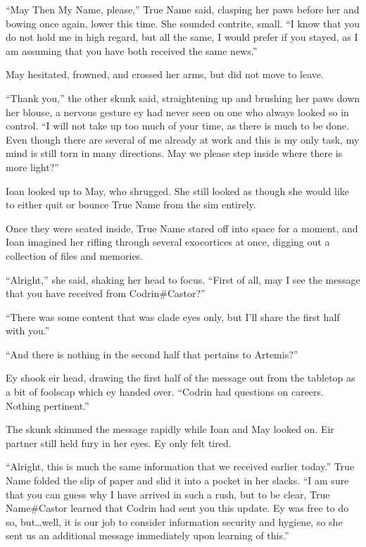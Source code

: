 ``May Then My Name, please,'' True Name said, clasping her paws before her and bowing once again, lower this time. She sounded contrite, small. ``I know that you do not hold me in high regard, but all the same, I would prefer if you stayed, as I am assuming that you have both received the same news.''

May hesitated, frowned, and crossed her arms, but did not move to leave.

``Thank you,'' the other skunk said, straightening up and brushing her paws down her blouse, a nervous gesture ey had never seen on one who always looked so in control. ``I will not take up too much of your time, as there is much to be done. Even though there are several of me already at work and this is my only task, my mind is still torn in many directions. May we please step inside where there is more light?''

Ioan looked up to May, who shrugged. She still looked as though she would like to either quit or bounce True Name from the sim entirely.

Once they were seated inside, True Name stared off into space for a moment, and Ioan imagined her rifling through several exocortices at once, digging out a collection of files and memories.

``Alright,'' she said, shaking her head to focus. ``First of all, may I see the message that you have received from Codrin\#Castor?''

``There was some content that was clade eyes only, but I'll share the first half with you.''

``And there is nothing in the second half that pertains to Artemis?''

Ey shook eir head, drawing the first half of the message out from the tabletop as a bit of foolscap which ey handed over. ``Codrin had questions on careers. Nothing pertinent.''

The skunk skimmed the message rapidly while Ioan and May looked on. Eir partner still held fury in her eyes. Ey only felt tired.

``Alright, this is much the same information that we received earlier today.'' True Name folded the slip of paper and slid it into a pocket in her slacks. ``I am sure that you can guess why I have arrived in such a rush, but to be clear, True Name\#Castor learned that Codrin had sent you this update. Ey was free to do so, but\ldots well, it is our job to consider information security and hygiene, so she sent us an additional message immediately upon learning of this.''

